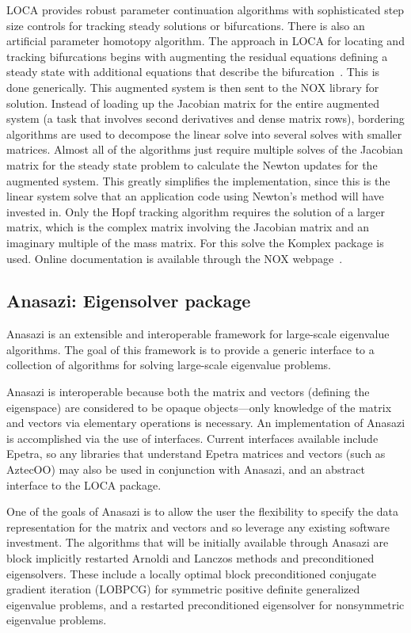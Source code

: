\documentclass[12pt,relax]{TrilinosOverview}
\begin{document}
LOCA provides robust parameter continuation algorithms 
with sophisticated step size controls for tracking steady
solutions or bifurcations. There is also an
artificial parameter homotopy algorithm.
The approach in LOCA for locating and tracking bifurcations begins with augmenting 
the residual equations defining a steady state with additional equations that 
describe the bifurcation~\cite{LOCA-manual}. This is done generically. This 
augmented system is then sent to the NOX library for solution.
Instead of loading up the Jacobian matrix for the entire 
augmented system (a task that involves second derivatives and dense matrix rows), 
bordering algorithms are used to decompose the linear solve into several solves 
with smaller matrices. Almost all of the algorithms just require multiple solves 
of the Jacobian matrix for the steady state problem to calculate the Newton 
updates for the augmented system. This greatly simplifies the implementation, 
since this is the linear system solve that an application code using Newton's 
method will have invested in. Only the Hopf tracking algorithm requires 
the solution of a larger matrix, which is the complex matrix involving the 
Jacobian matrix and an imaginary multiple of the mass matrix. For this solve
the Komplex package is used. Online documentation is available
through the NOX webpage~\cite{NOX-home-page}.

\subsection{Anasazi: Eigensolver package}


Anasazi is an extensible and interoperable framework for 
large-scale eigenvalue algorithms.  The goal of this 
framework is to provide a generic interface to a collection 
of algorithms for solving large-scale eigenvalue problems. 

Anasazi is interoperable because both the matrix and vectors (defining the
eigenspace) are considered to be opaque objects---only knowledge of the matrix and
vectors via elementary operations is necessary. An implementation of Anasazi
is accomplished via the use of interfaces. Current interfaces available include
Epetra, so any libraries that understand Epetra matrices and vectors (such
as AztecOO) may also be used in conjunction with Anasazi, and an abstract interface
to the LOCA package.

One of the goals of Anasazi is to allow the user the flexibility 
to specify the data representation for the matrix and vectors and 
so leverage any existing software
investment. The algorithms that will be initially available through 
Anasazi are block implicitly restarted Arnoldi and Lanczos methods 
and preconditioned eigensolvers.
These include a locally optimal block preconditioned conjugate 
gradient iteration  (LOBPCG) for symmetric positive definite 
generalized eigenvalue problems, and a 
restarted preconditioned eigensolver for nonsymmetric eigenvalue problems.
\end{document}
